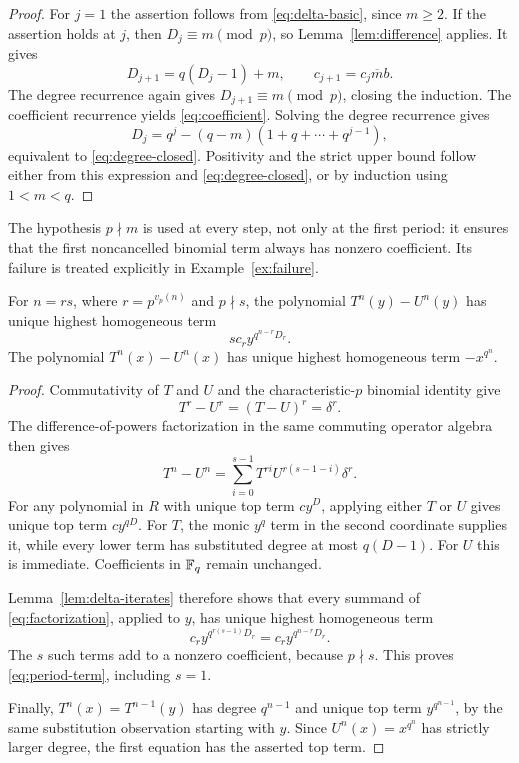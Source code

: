 \begin{proof}
For $j=1$ the assertion follows from \eqref{eq:delta-basic}, since
$m\ge2$. If the assertion holds at $j$, then
$D_j\equiv m\pmod p$, so Lemma~\ref{lem:difference} applies. It gives
\[
 D_{j+1}=q(D_j-1)+m,\qquad
 c_{j+1}=c_j\overline m b.
\]
The degree recurrence again gives $D_{j+1}\equiv m\pmod p$, closing
the induction. The coefficient recurrence yields \eqref{eq:coefficient}.
Solving the degree recurrence gives
\[
 D_j=q^j-(q-m)(1+q+\cdots+q^{j-1}),
\]
equivalent to \eqref{eq:degree-closed}. Positivity and the strict upper
bound follow either from this expression and \eqref{eq:degree-closed},
or by induction using $1<m<q$.
\end{proof}

The hypothesis $p\nmid m$ is used at every step, not only at the first
period: it ensures that the first noncancelled binomial term always
has nonzero coefficient. Its failure is treated explicitly in
Example~\ref{ex:failure}.

\begin{proposition}\label{prop:period-degree}
For $n=rs$, where $r=p^{v_p(n)}$ and $p\nmid s$, the polynomial
$T^n(y)-U^n(y)$ has unique highest homogeneous term
\begin{equation}\label{eq:period-term}
 s c_r y^{q^{n-r}D_r}.
\end{equation}
The polynomial $T^n(x)-U^n(x)$ has unique highest homogeneous term
$-x^{q^n}$.
\end{proposition}

\begin{proof}
Commutativity of $T$ and $U$ and the characteristic-$p$ binomial
identity give
\[
 T^r-U^r=(T-U)^r=\delta^r.
\]
The difference-of-powers factorization in the same commuting operator
algebra then gives
\begin{equation}\label{eq:factorization}
 T^n-U^n
 =\sum_{i=0}^{s-1}T^{ri}U^{r(s-1-i)}\delta^r.
\end{equation}
For any polynomial in $R$ with unique top term $cy^D$, applying either
$T$ or $U$ gives unique top term $cy^{qD}$. For $T$, the monic $y^q$
term in the second coordinate supplies it, while every lower term
has substituted degree at most $q(D-1)$. For $U$ this is immediate.
Coefficients in $\mathbb F_q$ remain unchanged.

Lemma~\ref{lem:delta-iterates} therefore shows that every summand of
\eqref{eq:factorization}, applied to $y$, has unique highest homogeneous
term
\[
 c_r y^{q^{r(s-1)}D_r}=c_r y^{q^{n-r}D_r}.
\]
The $s$ such terms add to a nonzero coefficient, because $p\nmid s$.
This proves \eqref{eq:period-term}, including $s=1$.

Finally, $T^n(x)=T^{n-1}(y)$ has degree $q^{n-1}$ and unique top
term $y^{q^{n-1}}$, by the same substitution observation starting
with $y$. Since $U^n(x)=x^{q^n}$ has strictly larger degree, the first
equation has the asserted top term.
\end{proof}
